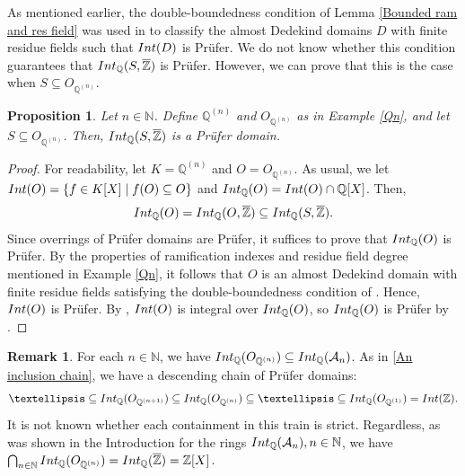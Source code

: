\documentclass{article}
\newtheorem{Prop}[equation]{Proposition}
\theoremstyle{definition}\newtheorem{Def}[equation]{Definition}
\newtheorem{Rem}[equation]{Remark}
\theoremstyle{definition}\newtheorem{Ques}[equation]{Question}
\theoremstyle{definition}\newtheorem{Conj}[equation]{Conjecture}
\theoremstyle{definition}\newtheorem{Not}[equation]{Notation}
\newcommand{\N}{\mathbb{N}}
\newcommand{\Q}{\mathbb{Q}}
\newcommand{\oZ}{\overline{\Z}}
\newcommand{\Z}{\mathbb{Z}}
\newcommand{\Int}{\textnormal{Int}}
\newcommand{\IntQ}{\Int_{\Q}}
\numberwithin{equation}{section}
\begin{document}
As mentioned earlier, the double-boundedness condition of Lemma \ref{Bounded ram and res field} was used in \cite{LopIntD} to classify the almost Dedekind domains $D$ with finite residue fields such that $\Int(D)$ is Pr\"{u}fer. We do not know whether this condition guarantees that $\IntQ(S,\oZ)$ is Pr\"{u}fer. However, we can prove that this is the case when $S \subseteq O_{\Q^{(n)}}$.

\begin{Prop}\label{Qn Prufer prop}
Let $n \in \N$. Define $\Q^{(n)}$ and $O_{\Q^{(n)}}$ as in Example \ref{Qn}, and let $S \subseteq O_{\Q^{(n)}}$. Then, $\IntQ(S,\oZ)$ is a Pr\"{u}fer domain.
\end{Prop}
\begin{proof}
For readability, let $K = \Q^{(n)}$ and $O = O_{\Q^{(n)}}$. As usual, we let $\Int(O) = \{f \in K[X] \mid f(O) \subseteq O\}$ and $\IntQ(O) = \Int(O) \cap \Q[X]$. Then,
\begin{equation*}
\IntQ(O) = \IntQ(O,\oZ) \subseteq \IntQ(S,\oZ).
\end{equation*}
Since overrings of Pr\"{u}fer domains are Pr\"{u}fer, it suffices to prove that $\IntQ(O)$ is Pr\"{u}fer. By the properties of ramification indexes and residue field degree mentioned in Example \ref{Qn}, it follows that $O$ is an almost Dedekind domain with finite residue fields satisfying the double-boundedness condition of \cite[Theorem 2.5]{LopIntD}. Hence, $\Int(O)$ is Pr\"{u}fer.  By \cite[Lemma 2.20]{PerDedekind}, $\Int(O)$ is integral over $\IntQ(O)$, so $\IntQ(O)$ is Pr\"ufer by \cite[Theorem 22.4]{Gilm}. %
\end{proof}

\begin{Rem}\label{Qn remark}
For each $n \in \N$, we have $\IntQ(O_{\Q^{(n)}})\subseteq\IntQ(\mathcal{A}_n)$. As in \eqref{An inclusion chain}, we have a descending chain of Pr\"{u}fer domains:
\begin{equation*}
\ldots\subseteq\IntQ(O_{\Q^{(n+1)}})\subseteq\IntQ(O_{\Q^{(n)}})\subseteq\ldots\subseteq\IntQ(O_{\Q^{(1)}})=\Int(\Z).
\end{equation*}
It is not known whether each containment in this train is strict. Regardless, as was shown in the Introduction for the rings $\IntQ(\mathcal{A}_n), n\in\N$, we have $\bigcap_{n\in\N}\IntQ(O_{\Q^{(n)}})=\IntQ(\oZ)=\Z[X]$.

\end{Rem}
\end{document}
